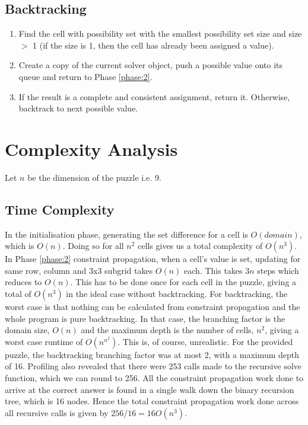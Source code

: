 \documentclass[11pt, a4paper]{article}
\begin{document}
\subsection{Backtracking}
\label{phase:3}
\begin{enumerate}
  \item Find the cell with possibility set with the smallest possibility set size and size $>$ 1 (if the size is 1, then the cell has already been assigned a value).
  \item Create a copy of the current solver object, push a possible value onto its queue and return to Phase \ref{phase:2}.
  \item If the result is a complete and consistent assignment, return it. Otherwise, backtrack to next possible value.
\end{enumerate}

\section{Complexity Analysis}
Let $n$ be the dimension of the puzzle i.e. 9.

\subsection{Time Complexity}
In the initialisation phase, generating the set difference for a cell is $O(domain)$, which is $O(n)$. Doing so for all $n^2$ cells gives us a total complexity of $O(n^3)$.
In Phase \ref{phase:2} constraint propagation, when a cell's value is set, updating for same row, column and 3x3 subgrid takes $O(n)$ each.
This takes $3n$ steps which reduces to $O(n)$.
This has to be done once for each cell in the puzzle, giving a total of $O(n^3)$ in the ideal case without backtracking.
For backtracking, the worst case is that nothing can be calculated from constraint propagation and the whole program is pure backtracking. In that case, the branching factor is the domain size, $O(n)$ and the maximum depth is the number of cells, $n^2$, giving a worst case runtime of $O(n^n^2)$.
This is, of course, unrealistic. For the provided puzzle, the backtracking branching factor was at most 2, with a maximum depth of 16. Profiling also revealed that there were 253 calls made to the recursive solve function, which we can round to 256. All the constraint propagation work done to arrive at the correct answer is found in a single walk down the binary recursion tree, which is 16 nodes. Hence the total constraint propagation work done across all recursive calls is given by $256/16=16O(n^3)$.
\end{document}
